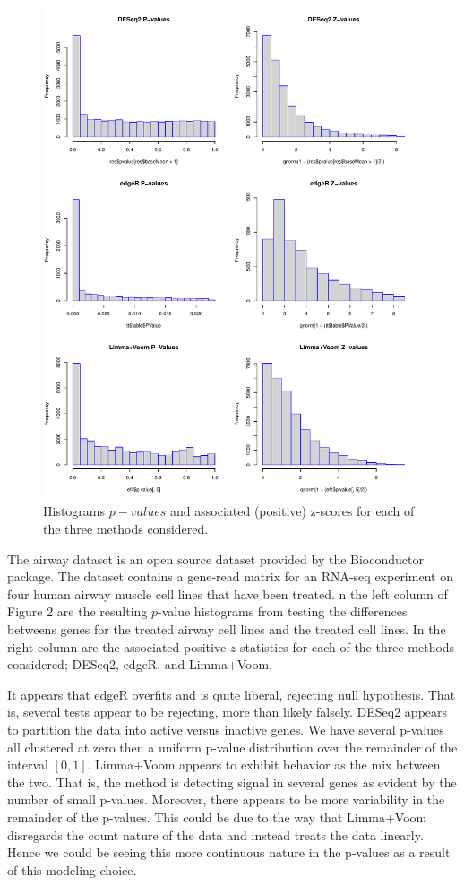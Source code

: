 \documentclass[11pt]{article}
\begin{document}
\begin{figure}
	\centering
	\includegraphics[scale = 0.4]{code/p_value_hist.pdf}
	\caption{Histograms $p-values$ and associated (positive) z-scores for each of the three methods considered.}
\end{figure}
The airway dataset is an open source dataset provided by the Bioconductor package. The dataset contains a gene-read matrix for an RNA-seq experiment on four human airway muscle cell lines that have been treated. n the left column of Figure 2 are the resulting $p$-value histograms from testing the differences betweens genes for the treated airway cell lines and the treated cell lines. In the right column are the associated positive $z$ statistics for each of the three methods considered; DESeq2, edgeR, and Limma+Voom. 

It appears that edgeR overfits and is quite liberal, rejecting null hypothesis. That is, several tests appear to be rejecting, more than likely falsely. DESeq2 appears to partition the data into active versus inactive genes. We have several p-values all clustered at zero then a uniform p-value distribution over the remainder of the interval $[0,1]$. Limma+Voom appears to exhibit behavior as the mix between the two. That is, the method is detecting signal in several genes as evident by the number of small p-values. Moreover, there appears to be more variability in the remainder of the p-values. This could be due to the way that Limma+Voom disregards the count nature of the data and instead treats the data linearly. Hence we could be seeing this more continuous nature in the p-values as a result of this modeling choice. 
\end{document}
